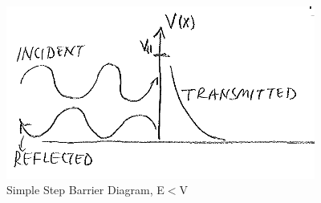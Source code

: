 \documentclass{school-22.101-notes}
\date{September 26, 2011}
\begin{document}
\maketitle


\begin{figure}[h!]
    \centering
    \includegraphics[width=4in]{images/qm/step-barrier-caseB.png}
    \caption{Simple Step Barrier Diagram, E$<$V}
\end{figure}
\end{document}
